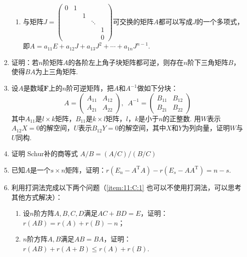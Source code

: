 \begin{enumerate}
\begin{enumerate}
              \item 与矩阵$J=\begin{pmatrix}
                            0 & 1 &   &        &   \\
                              &   & 1 &        &   \\
                              &   &   & \ddots &   \\
                              &   &   &        & 1 \\
                              &   &   &        & 0
                        \end{pmatrix}$可交换的矩阵$A$都可以写成$J$的一个多项式，即$A=a_{11}E+a_{12}J+a_{13}J^2+\cdots+a_{1n}J^{n-1}$.
          \end{enumerate}

    \item 证明：若$n$阶矩阵$A$的各阶左上角子块矩阵都可逆，则存在$n$阶下三角矩阵$B$，使得$BA$为上三角矩阵.

    \item 设$A$是数域$\mathbf{F}$上的$n$阶可逆矩阵，把$A$和$A^{-1}$做如下分块：
        \[A=\begin{pmatrix}
                A_{11} & A_{12} \\ A_{21} & A_{22}
            \end{pmatrix},\enspace A^{-1}=\begin{pmatrix}
                B_{11} & B_{12} \\ B_{21} & B_{22}
            \end{pmatrix}\]
        其中$A_{11}$是$l \times k$矩阵，$B_{11}$是$k \times l$矩阵，$l$，$k$是小于$n$的正整数. 用$W$表示$A_{12}X=0$的解空间，$U$表示$B_{12}Y=0$的解空间，其中$X$和$Y$为列向量，证明$W$与$U$同构.

    \item 证明 Schur补的商等式 $A/B=(A/C)/(B/C)$%

    \item 已知$A$是一个$s \times n$矩阵，证明：$r(E_n-A^\mathrm{T}A)-r(E_s-AA^\mathrm{T})=n-s$.

    \item 利用打洞法完成以下两个问题（\ref*{item:11:C:1} 也可以不使用打洞法，可以思考其他方式解决）：
          \begin{enumerate}
              \item 设$n$阶方阵$A,B,C,D$满足$AC+BD=E$，证明：$r(AB) = r(A)+r(B)-n$；

              \item \label{item:11:C:1}
                    $n$阶方阵$A,B$满足$AB=BA$，证明：$r(AB)+r(A+B)\leqslant r(A)+r(B)$.
          \end{enumerate}


\end{enumerate}
